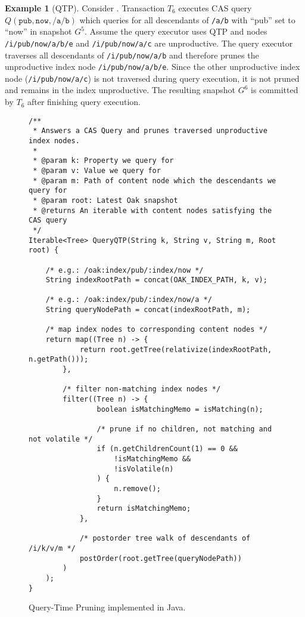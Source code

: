 \documentclass[abstracton,12pt]{scrartcl}
\theoremstyle{definition}
\newtheorem{example}{Example}
\begin{document}
\begin{example}[QTP]
  Consider . Transaction $T_6$ executes CAS query
  $Q(\texttt{pub},\texttt{now},\texttt{/a/b})$ which queries for all descendants
  of \texttt{/a/b} with ``pub'' set to ``now'' in snapshot $G^5$. Assume the
  query executor uses QTP and nodes \texttt{/i/pub/now/a/b/e} and
  \texttt{/i/pub/now/a/c} are unproductive. The
  query executor traverses all descendants of \texttt{/i/pub/now/a/b} and
  therefore prunes the unproductive index node \texttt{/i/pub/now/a/b/e}. Since
  the other unproductive index node (\texttt{/i/pub/now/a/c}) is not traversed
  during query execution,
  it is not pruned and remains in the index unproductive. The resulting
  snapshot $G^6$ is committed by $T_6$ after finishing query execution.
\end{example}



\begin{figure}[H]
  \footnotesize
  \begin{framed}    
\begin{verbatim}
/**
 * Answers a CAS Query and prunes traversed unproductive index nodes.
 *
 * @param k: Property we query for
 * @param v: Value we query for
 * @param m: Path of content node which the descendants we query for
 * @param root: Latest Oak snapshot
 * @returns An iterable with content nodes satisfying the CAS query
 */
Iterable<Tree> QueryQTP(String k, String v, String m, Root root) {

    /* e.g.: /oak:index/pub/:index/now */
    String indexRootPath = concat(OAK_INDEX_PATH, k, v); 

    /* e.g.: /oak:index/pub/:index/now/a */
    String queryNodePath = concat(indexRootPath, m);

    /* map index nodes to corresponding content nodes */
    return map((Tree n) -> {
            return root.getTree(relativize(indexRootPath, n.getPath()));
        },

        /* filter non-matching index nodes */
        filter((Tree n) -> {
                boolean isMatchingMemo = isMatching(n);

                /* prune if no children, not matching and not volatile */
                if (n.getChildrenCount(1) == 0 &&
                    !isMatchingMemo &&
                    !isVolatile(n)
                ) {
                    n.remove();
                }
                return isMatchingMemo;
            },

            /* postorder tree walk of descendants of /i/k/v/m */
            postOrder(root.getTree(queryNodePath))
        )
    );
} 
\end{verbatim}
\vspace{-0.2cm}
\end{framed}
  \vspace{-0.2cm}
  \caption[QTP implemented in Java]{Query-Time Pruning implemented in Java.}
  \label{fig:java_qtp}
\end{figure}
\end{document}
